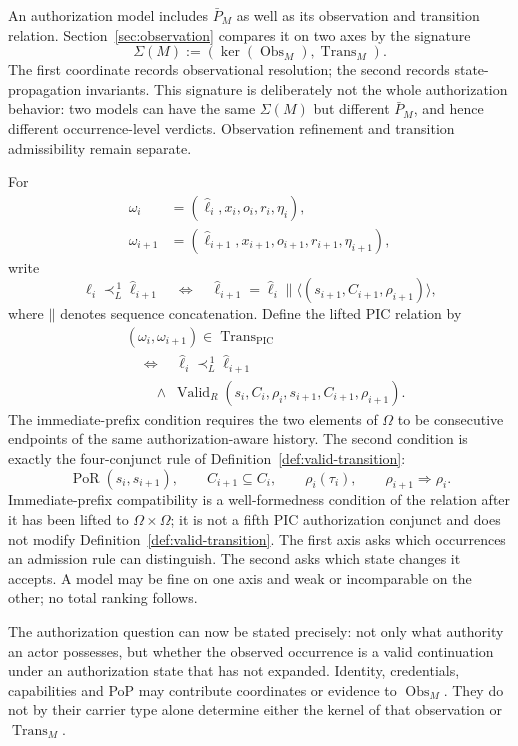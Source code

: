 \documentclass[10pt,twocolumn]{article}
\newcommand{\ValidR}{\operatorname{Valid}_{R}}
\newcommand{\PoR}{\operatorname{PoR}}
\begin{document}
An authorization model includes \(\bar P_M\) as well as its observation and
transition relation. Section~\ref{sec:observation} compares it on two axes by
the signature
\[
\Sigma(M):=
(\ker(\operatorname{Obs}_M),\operatorname{Trans}_M).
\]
The first coordinate records observational resolution; the second records
state-propagation invariants. This signature is deliberately not the whole
authorization behavior: two models can have the same \(\Sigma(M)\) but
different \(\bar P_M\), and hence different occurrence-level verdicts.
Observation refinement and transition admissibility remain separate.

For
\[
\begin{aligned}
\omega_i&=(\widehat{\ell}_i,x_i,o_i,r_i,\eta_i),\\
\omega_{i+1}&=(\widehat{\ell}_{i+1},x_{i+1},o_{i+1},r_{i+1},\eta_{i+1}),
\end{aligned}
\]
write
\[
\widehat{\ell}_i\prec_L^{\,1}\widehat{\ell}_{i+1}
\quad\Longleftrightarrow\quad
\widehat{\ell}_{i+1}
=\widehat{\ell}_i\mathbin{\|}
\langle(s_{i+1},C_{i+1},\rho_{i+1})\rangle,
\]
where \(\mathbin{\|}\) denotes sequence concatenation. Define the lifted PIC
relation by
\[
\begin{aligned}
&(\omega_i,\omega_{i+1})
\in\operatorname{Trans}_{\mathrm{PIC}}\\
&\quad\Longleftrightarrow\quad
\widehat{\ell}_i\prec_L^{\,1}\widehat{\ell}_{i+1}\\
&\qquad\land\;
\ValidR(s_i,C_i,\rho_i,
s_{i+1},C_{i+1},\rho_{i+1}).
\end{aligned}
\]
The immediate-prefix condition requires the two elements of \(\Omega\) to be
consecutive endpoints of the same authorization-aware history. The second
condition is exactly the four-conjunct rule of
Definition~\ref{def:valid-transition}:
\[
\PoR(s_i,s_{i+1}),\qquad
C_{i+1}\subseteq C_i,\qquad
\rho_i(\tau_i),\qquad
\rho_{i+1}\Rightarrow\rho_i.
\]
Immediate-prefix compatibility is a well-formedness condition of the relation
after it has been lifted to \(\Omega\times\Omega\); it is not a fifth PIC
authorization conjunct and does not modify
Definition~\ref{def:valid-transition}.
The first axis asks which occurrences an admission rule can distinguish. The
second asks which state changes it accepts. A model may be fine on one axis and
weak or incomparable on the other; no total ranking follows.

The authorization question can now be stated precisely: not only what
authority an actor possesses, but whether the observed occurrence is a valid
continuation under an authorization state that has not expanded. Identity,
credentials, capabilities and PoP may contribute coordinates or evidence to
\(\operatorname{Obs}_M\). They do not by their carrier type alone determine
either the kernel of that observation or \(\operatorname{Trans}_M\).
\end{document}
